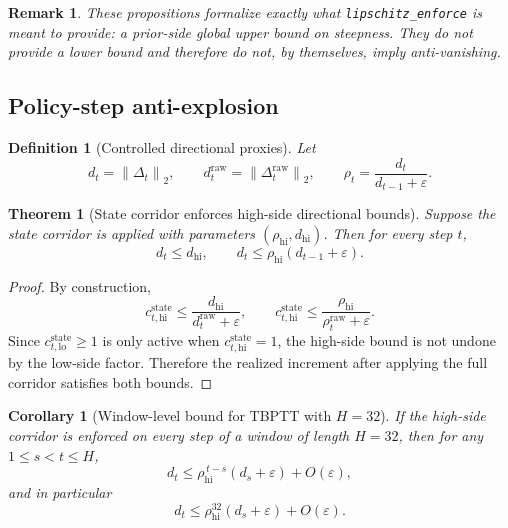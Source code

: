 \documentclass[11pt]{article}
\newtheorem{theorem}{Theorem}
\newtheorem{corollary}{Corollary}
\newtheorem{definition}{Definition}
\newtheorem{remark}{Remark}
\newcommand{\1}{\mathbf{1}}
\newcommand{\norm}[1]{\left\lVert #1 \right\rVert}
\begin{document}
\begin{remark}
These propositions formalize exactly what \texttt{lipschitz\_enforce} is meant to provide: a prior-side global upper bound on steepness. They do not provide a lower bound and therefore do not, by themselves, imply anti-vanishing.
\end{remark}

\subsection{Policy-step anti-explosion}
\begin{definition}[Controlled directional proxies]
Let
\begin{equation}
  d_t = \norm{\Delta_t}_2, \qquad
  d_t^{\mathrm{raw}} = \norm{\Delta_t^{\mathrm{raw}}}_2, \qquad
  \rho_t = \frac{d_t}{d_{t-1} + \varepsilon}.
\end{equation}
\end{definition}

\begin{theorem}[State corridor enforces high-side directional bounds]
Suppose the state corridor is applied with parameters $(\rho_{\mathrm{hi}}, d_{\mathrm{hi}})$. Then for every step $t$,
\begin{equation}
  d_t \le d_{\mathrm{hi}}, \qquad
  d_t \le \rho_{\mathrm{hi}}(d_{t-1} + \varepsilon).
\end{equation}
\end{theorem}

\begin{proof}
By construction,
\[
  c_{t,\mathrm{hi}}^{\mathrm{state}}
  \le \frac{d_{\mathrm{hi}}}{d_t^{\mathrm{raw}} + \varepsilon},
  \qquad
  c_{t,\mathrm{hi}}^{\mathrm{state}}
  \le \frac{\rho_{\mathrm{hi}}}{\rho_t^{\mathrm{raw}} + \varepsilon}.
\]
Since $c_{t,\mathrm{lo}}^{\mathrm{state}} \ge 1$ is only active when $c_{t,\mathrm{hi}}^{\mathrm{state}} = 1$, the high-side bound is not undone by the low-side factor. Therefore the realized increment after applying the full corridor satisfies both bounds.
\end{proof}

\begin{corollary}[Window-level bound for TBPTT with $H=32$]
If the high-side corridor is enforced on every step of a window of length $H=32$, then for any $1 \le s < t \le H$,
\begin{equation}
  d_t \le \rho_{\mathrm{hi}}^{\,t-s}(d_s + \varepsilon) + O(\varepsilon),
\end{equation}
and in particular
\begin{equation}
  d_t \le \rho_{\mathrm{hi}}^{32}(d_s + \varepsilon) + O(\varepsilon).
\end{equation}
\end{corollary}
\end{document}
